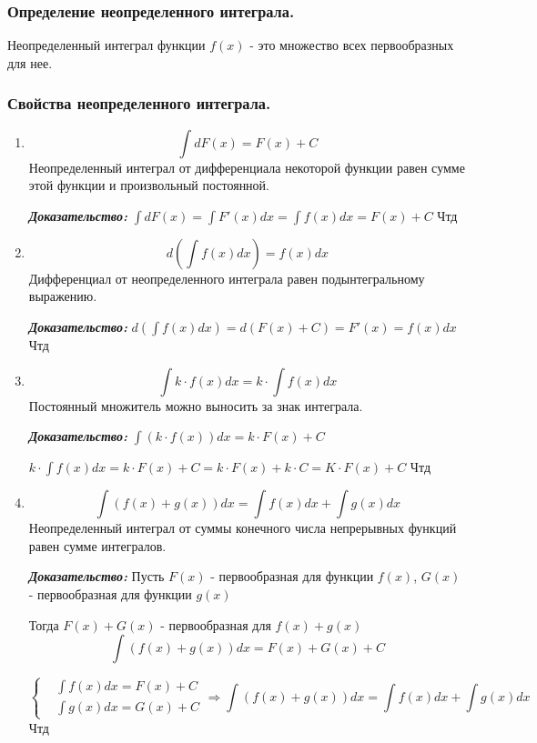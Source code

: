 \documentclass[a4paper,12pt]{article}
\theoremstyle{plain} %
\theoremstyle{definition} %
\theoremstyle{remark} %
\begin{document}
\subsubsection*{Определение неопределенного интеграла.}
Неопределенный интеграл функции $f(x)$ - это множество всех первообразных для нее.

\subsubsection*{Свойства неопределенного интеграла.}

\begin{enumerate}
	\item \[ \int dF(x) = F(x) + C \]
	      Неопределенный интеграл от дифференциала некоторой функции равен сумме этой функции и произвольный постоянной.

	      \textit{\textbf{Доказательство:}} $\int dF(x) = \int F'(x)dx = \int f(x)dx = F(x) + C$ Чтд

	\item \[ d \left( \int f(x) dx \right) = f(x)dx  \]
	      Дифференциал от неопределенного интеграла равен подынтегральному выражению.

	      \textit{\textbf{Доказательство:}} $d\left( \int f(x)dx \right) = d \left( F(x) + C \right) = F'(x) = f(x)dx$ Чтд

	\item \[ \int k \cdot f(x) dx = k \cdot \int f(x) dx \]
	      Постоянный множитель можно выносить за знак интеграла.

	      \textit{\textbf{Доказательство:}} $\int (k \cdot f(x)) dx = k \cdot F(x) + C$

	      $k \cdot \int f(x) dx = k \cdot F(x) + C = k \cdot F(x) + k \cdot C = K\cdot F(x) + C$ Чтд

	\item \[ \int (f(x) + g(x)) dx = \int f(x) dx + \int g(x) dx \]
	      Неопределенный интеграл от суммы конечного числа непрерывных функций равен сумме интегралов.

	      \textit{\textbf{Доказательство:}} Пусть $F(x)$ - первообразная для функции $f(x)$, $G(x)$ - первообразная для функции $g(x)$

	      Тогда $F(x) + G(x)$ - первообразная для $f(x) + g(x)$ \[ \int (f(x) + g(x))dx = F(x) + G(x) + C \]

	      \[ \begin{cases}
			       & \int f(x)dx = F(x) + C  \\
			       & \int g(x) dx = G(x) + C
		      \end{cases} \Rightarrow \int (f(x) + g(x))dx = \int f(x)dx + \int g(x) dx\]
	      Чтд
\end{enumerate}
\end{document}
